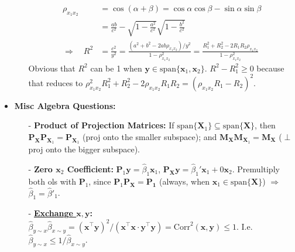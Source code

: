 \documentclass[9pt, landscape]{article}
\begin{document}
\begin{multicols*}{3}
\begin{itemize}
\begin{itemize}[leftmargin=10pt,noitemsep,topsep=0pt,partopsep=0pt]
\begin{center}
		\end{center} 
		{\scriptsize
		\begin{equation*}
			\begin{split}
			\rho_{x_1x_2} &= \cos(\alpha + \beta) = \cos \alpha \cos \beta - \sin \alpha \sin \beta \\
			&= \frac{ab}{c^2} - \sqrt{1-\frac{a^2}{c^2}} \sqrt{1-\frac{b^2}{c^2}}\\
			\Rightarrow \quad R^2 &= \frac{c^2}{y^2} = \frac{(a^2 + b^2 - 2ab \rho_{x_1x_2}) / y^2}{1-\rho_{x_1x_2}^2} = \frac{R_1^2 + R_2^2 - 2R_1R_2 \rho_{x_1x_2}}{1-\rho_{x_1x_2}^2}
			\end{split}
		\end{equation*}}
		Obvious that $R^2$ can be 1 when $\bm{y} \in \text{span}\{\bm{x}_1, \bm{x}_2\}$. $R^2 - R_1^2 \geq 0$ because that reduces to $\rho^2_{x_1x_2}R_1^2 + R_2^2 - 2\rho_{x_1x_2} R_1 R_2 = (\rho_{x_1x_2}R_1 - R_2)^2$. 
	\end{itemize}
	\item \textbf{{Misc Algebra Questions}:}
	\begin{itemize}[leftmargin=10pt,noitemsep,topsep=0pt,partopsep=0pt]
		\item[-] \textbf{Product of Projection Matrices:} If $\text{span}\{ \bm{X}_1 \} \subseteq \text{span} \{ \bm{X}\}$, then $\bm{P}_{\bm{X}} \bm{P}_{\bm{X}_1} = \bm{P}_{\bm{X}_1}$ (proj onto the smaller subspace); and $\bm{M}_{\bm{X}} \bm{M}_{\bm{X}_1} = \bm{M}_{\bm{X}}$ ($\perp$proj onto the bigger subspace).
		\item[-] \textbf{Zero $\bm{x}_2$ Coefficient:} $\bm{P}_1 \bm{y} = \widehat{\beta}_1 \bm{x}_1$, $\bm{P}_{\bm{X}} \bm{y} = \widehat{\beta}_1' \bm{x}_1 + 0 \bm{x}_2$. Premultiply both ols with $\bm{P}_1$, since $\bm{P}_1 \bm{P}_{\bm{X}} = \bm{P_{1}}$ (always, when $\bm{x}_1 \in \text{span}\{\bm{X}\}$) $\Rightarrow$ $\widehat{\beta}_1 = \widehat{\beta}'_1$. 
		\item[-] \textbf{\href{https://stats.stackexchange.com/questions/20553/effect-of-switching-response-and-explanatory-variable-in-simple-linear-regressio}{Exchange $\bm{x}, \bm{y}$}:} $\widehat{\beta}_{y\sim x} \widehat{\beta}_{x\sim y} = (\bm{x}^{\top} \bm{y})^2 / (\bm{x}^{\top} \bm{x}\cdot \bm{y}^{\top} \bm{y}) = \text{Corr}^2(\bm{x}, \bm{y}) \leq 1$. I.e. $\widehat{\beta}_{y\sim x} \leq 1/ \widehat{\beta}_{x\sim y}$.

\end{itemize}
\end{itemize}
\end{multicols*}
\end{document}
